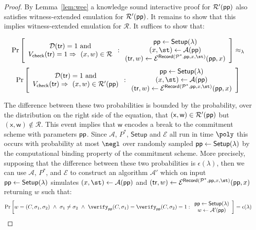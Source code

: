 \documentclass{article}
\theoremstyle{definition}
\begin{document}
\begin{proof}
By Lemma~\ref{lem:wee} a knowledge sound interactive proof for $\mathcal{R}'(\textsf{pp})$ also satisfies witness-extended emulation for $\mathcal{R}'(\textsf{pp})$. It remains to show that this implies witness-extended emulation for $\mathcal{R}$. It suffices to show that: 

\begin{small}
\[
\Pr \left[
\begin{array}{c} 
\mathcal{D}(\textsf{tr}) = 1 \ \text{and} \\ 
V_{\textsf{check}}(\tr) = 1 \Rightarrow \ (x, w) \in \mathcal{R}
\end{array} 
:
\begin{array}{c}
             \params \leftarrow \textsf{Setup}(\lambda) \\
             (x, \st) \leftarrow \mathcal{A}(\params) \\
(\textsf{tr}, w) \leftarrow \mathcal{E}^{\textsf{Record}(\prover^*, \params, x, \st)}(\params, x)
\end{array}
\right] \approx_\lambda
\]
\[
\Pr \left[
\begin{array}{c} 
\mathcal{D}(\textsf{tr}) = 1 \ \text{and} \\ 
V_{\textsf{check}}(\tr) \Rightarrow \ (x, w) \in \mathcal{R}'(\crs)
\end{array} 
:
\begin{array}{c}
             \params \leftarrow \textsf{Setup}(\lambda) \\
             (x, \st) \leftarrow \mathcal{A}(\params) \\
(\textsf{tr}, w) \leftarrow \mathcal{E}^{\textsf{Record}(\prover^*, \params, x, \st)}(\params, x)
\end{array}
\right]
\]
\end{small}

The difference between these two probabilities is bounded by the probability, over the distribution on the right side of the equation, that $(\mathsf{x}, \mathsf{w}) \in \mathcal{R}'(\textsf{pp})$ but $(\mathsf{x}, \mathsf{w}) \not \in \mathcal{R}$. This event implies that $\mathsf{w}$ encodes a break to the commitment scheme with parameters $\textsf{pp}$. Since $\mathcal{A}$, $P^*$, $\textsf{Setup}$ and $\mathcal{E}$ all run in time $\poly$ this occurs with probability at most $\negl$ over randomly sampled $\textsf{pp} \gets \textsf{{Setup}}(\lambda)$ by the computational binding property of the commitment scheme. More precisely, supposing that the difference between these two probabilities is $\epsilon(\lambda)$, then we can use $\mathcal{A}$, $P^*$, and $\mathcal{E}$ to construct an algorithm $\mathcal{A}'$ which on input $\textsf{pp} \gets \textsf{{Setup}}(\lambda)$ simulates $(x, \st) \gets \mathcal{A}(\crs)$ and $(\tr, w) \gets \mathcal{E}^{\textsf{Record}(\prover^*, \params, x, \st)}(\params, x)$ returning $w$ such that: 
\[
\Pr \left[
w = (C, \sigma_1, \sigma_2) \ \wedge \ \sigma_1 \neq \sigma_2 \ \wedge \ \verify_\crs(C, \sigma_1) = \verify_\crs(C, \sigma_2) = 1
:
\begin{array}{c}
             \params \leftarrow \textsf{Setup}(\lambda) \\
             w \gets \mathcal{A}'(\crs)
\end{array}
\right] = \epsilon(\lambda) 
\]


\end{proof}
\end{document}
